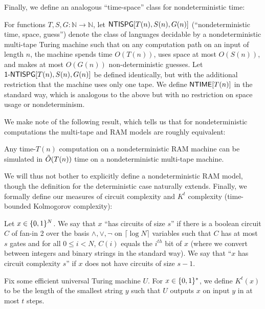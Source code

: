 Finally, we define an analogous ``time-space'' class for nondeterministic time:
\begin{definition}
\sloppy For functions $T,S,G\colon\mathbb{N} \rightarrow \mathbb{N}$, let $\cl{NTISPG}[T(n),S(n),G(n)]$ (``nondeterministic time, space, guess'')  denote the class of languages decidable by a nondeterministic multi-tape Turing machine such that on any computation path on an input of length $n$, the machine spends time $O(T(n))$, uses space at most $O(S(n))$, and makes at most $O(G(n))$ non-deterministic guesses. Let $\cl{1\dash NTISPG}[T(n),S(n),G(n)]$ be defined identically, but with the additional restriction that the machine uses only one tape. We define $\cl{NTIME}[T(n)]$ in the standard way, which is analogous to the above but with no restriction on space usage or nondeterminism.
\end{definition}
We make note of the following result, which tells us that for nondeterministic computations the multi-tape and RAM models are roughly equivalent:
\begin{lemma}\label{lossy:lem:ram-tape-same}\cite{NLT}
Any time-$T(n)$ computation on a nondeterministic RAM machine can be simulated in $\Tilde{O}(T(n))$ time on a nondeterministic multi-tape machine.
\end{lemma}
We will thus not bother to explicitly define a nondeterministic RAM model, though the definition for the deterministic case naturally extends. Finally, we formally define our measures of circuit complexity and $K^t$ complexity (time-bounded Kolmogorov complexity):
\begin{definition}
Let $x \in \B^N$. We say that $x$ ``has circuits of size $s$'' if there is a boolean circuit $C$ of fan-in 2 over the basis $\land,\lor,\lnot$ on $\lceil \log N \rceil$ variables such that $C$ has at most $s$ gates and for all $0 \leq i < N$, $C(i)$ equals the $i^{th}$ bit of $x$ (where we convert between integers and binary strings in the standard way). We say that ``$x$ has circuit complexity $s$'' if $x$ does not have circuits of size $s-1$.
\end{definition}
\begin{definition}
Fix some efficient universal Turing machine $U$. For $x \in \B^*$, we define $K^t(x)$ to be the length of the smallest string $y$ such that $U$ outputs $x$ on input $y$ in at most $t$ steps.
\end{definition}
